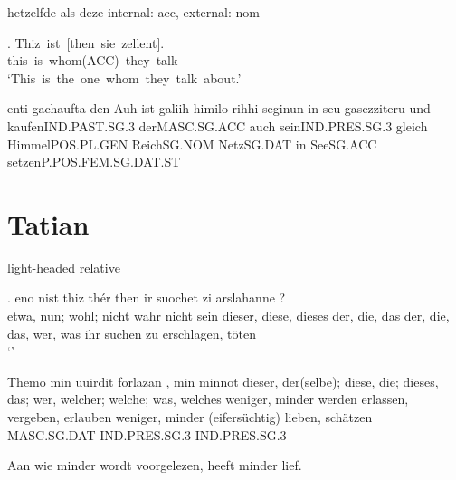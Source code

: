 hetzelfde als deze
internal: acc, external: nom

\exg. Thiz ist [then sie zellent].\\
 this is whom(ACC) they talk\\
 `This is the one whom they talk about.' 



 enti	gachaufta	den	Auh	ist	galiih	himilo	rihhi	seginun	in	seu	gasezziteru
 und	kaufenIND.PAST.SG.3		derMASC.SG.ACC		auch	seinIND.PRES.SG.3	gleich	HimmelPOS.PL.GEN	ReichSG.NOM		NetzSG.DAT		in	SeeSG.ACC		setzenP.POS.FEM.SG.DAT.ST


\phantom{x}

\section{Tatian}

light-headed relative

\exg. eno	nist	thiz	thér	then	ir	suochet	zi	arslahanne	?\\
 etwa, nun; wohl; nicht wahr	nicht	sein	dieser, diese, dieses	der, die, das	der, die, das, wer, was	ihr	suchen	zu	erschlagen, töten\\
 `'




 Themo	min	uuirdit	forlazan	,	min	minnot
 dieser, der(selbe); diese, die; dieses, das; wer, welcher; welche; was, welches	weniger, minder	werden	erlassen, vergeben, erlauben		weniger, minder	(eifersüchtig) lieben, schätzen
 MASC.SG.DAT		IND.PRES.SG.3				IND.PRES.SG.3

 Aan wie minder wordt voorgelezen, heeft minder lief.
